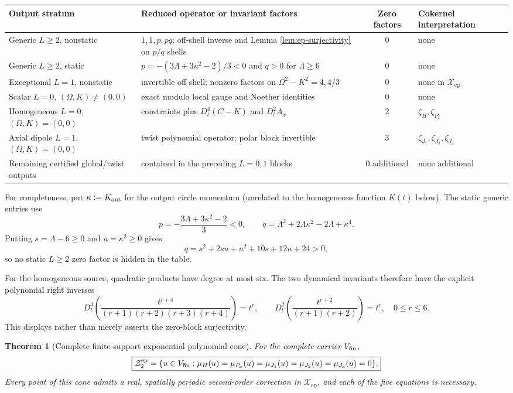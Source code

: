 \documentclass[11pt]{article}
\newtheorem{theorem}{Theorem}[section]
\theoremstyle{definition}
\theoremstyle{remark}
\newcommand{\cZ}{\mathcal Z}
\newcommand{\Xep}{\mathscr X_{\mathrm{ep}}}
\begin{document}
\begin{center}
\small
\begin{tabularx}{0.99\textwidth}{@{}Y Y c Y@{}}
\toprule
Output stratum & Reduced operator or invariant factors & Zero factors &
Cokernel interpretation\\
\midrule
Generic $L\ge2$, nonstatic & $1,1,p,pq$; off-shell inverse and Lemma
\ref{lem:ep-surjectivity} on $p/q$ shells & 0 & none\\
Generic $L\ge2$, static & $p=-(3\Lambda+3\kappa^2-2)/3<0$ and
$q>0$ for $\Lambda\ge6$ & 0 & none\\
Exceptional $L=1$, nonstatic & invertible off shell; nonzero factors on
$\Omega^2-K^2=4,4/3$ & 0 & none in $\Xep$\\
Scalar $L=0$, $(\Omega,K)\ne(0,0)$ & exact modulo local gauge and Noether
identities & 0 & none\\
Homogeneous $L=0$, $(\Omega,K)=(0,0)$ & constraints plus
$D_t^4(C-K)$ and $D_t^2A_x$ & 2 & $\zeta_H,\zeta_{P_x}$\\
Axial dipole $L=1$, $(\Omega,K)=(0,0)$ & twist polynomial operator;
polar block invertible & 3 & $\zeta_{J_1},\zeta_{J_2},\zeta_{J_3}$\\
Remaining certified global/twist outputs & contained in the preceding
$L=0,1$ blocks & 0 additional & none additional\\
\bottomrule
\end{tabularx}
\end{center}

For completeness, put \(\kappa:=K_{\rm out}\) for the output circle
momentum (unrelated to the homogeneous function \(K(t)\) below).  The static
generic entries use
\[
 p=-\frac{3\Lambda+3\kappa^2-2}{3}<0,
 \qquad
 q=\Lambda^2+2\Lambda\kappa^2-2\Lambda+\kappa^4.
\]
Putting \(s=\Lambda-6\ge0\) and \(u=\kappa^2\ge0\) gives
\[
 q=s^2+2su+u^2+10s+12u+24>0,
\]
so no static \(L\ge2\) zero factor is hidden in the table.

For the homogeneous source, quadratic products have degree at most six.
The two dynamical invariants therefore have the explicit polynomial right
inverses
\[
 D_t^4\!\left(\frac{t^{r+4}}{(r+1)(r+2)(r+3)(r+4)}\right)=t^r,
 \qquad
 D_t^2\!\left(\frac{t^{r+2}}{(r+1)(r+2)}\right)=t^r,
 \quad 0\le r\le6.
\]
This displays rather than merely asserts the zero-block surjectivity.

\begin{theorem}[Complete finite-support exponential-polynomial cone]
\label{thm:ep-cone}
For the complete carrier \(V_{\rm fin}\),
\begin{equation}\label{eq:ep-cone}
 \boxed{
 \cZ^{\rm ep}_2
 =\{u\in V_{\rm fin}:\mu_H(u)=\mu_{P_x}(u)=
    \mu_{J_1}(u)=\mu_{J_2}(u)=\mu_{J_3}(u)=0\}.}
\end{equation}
Every point of this cone admits a real, spatially periodic second-order
correction in \(\Xep\), and each of the five equations is necessary.
\end{theorem}
\end{document}
